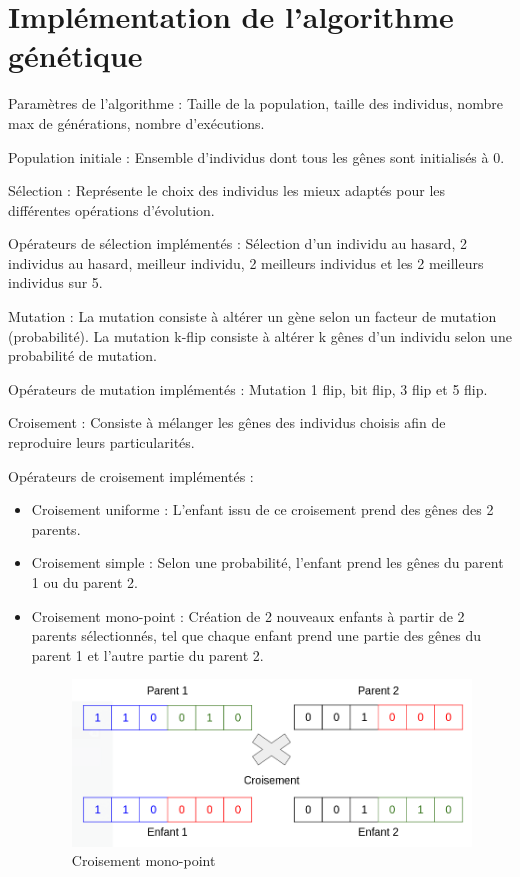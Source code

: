 \documentclass[12pt]{article}
\begin{document}
\section{Implémentation de l'algorithme génétique}
\begin{description}

\item{Paramètres de l'algorithme :} Taille de la population, taille des individus, nombre max de générations, nombre d'exécutions.

\item{Population initiale :} Ensemble d'individus dont tous les gênes sont initialisés à 0.

\item{Sélection :} Représente le choix des individus les mieux adaptés pour les différentes opérations d'évolution.
\item{Opérateurs de sélection implémentés :}  Sélection d'un individu au hasard, 2 individus au hasard, meilleur individu, 2 meilleurs individus et les 2 meilleurs individus sur 5.

\item{Mutation :} La mutation consiste à altérer un gène selon un facteur de mutation (probabilité). La mutation k-flip consiste à altérer k gênes d'un individu selon une probabilité de mutation.
\item{Opérateurs de mutation implémentés : } Mutation 1 flip, bit flip, 3 flip et 5 flip.

\item{Croisement :} Consiste à mélanger les gênes des individus choisis afin de reproduire leurs particularités.
\item{Opérateurs de croisement implémentés :}
\begin{itemize}[label=-]
\item Croisement uniforme : L'enfant issu de ce croisement prend des gênes des 2 parents.
\item Croisement simple : Selon une probabilité, l'enfant prend les gênes du parent 1 ou du parent 2.
\item Croisement mono-point : Création de 2 nouveaux enfants à partir de 2 parents sélectionnés, tel que chaque enfant prend une partie des gênes du parent 1 et l'autre partie du parent 2.

\begin{figure}[H]
		\begin{center}
			\includegraphics[scale=0.4]{img/crois_mono_point.png}
			\caption{Croisement mono-point}
			\label{crois_mono-point}
		\end{center}
\end{figure}


\end{itemize}
\end{description}
\end{document}
